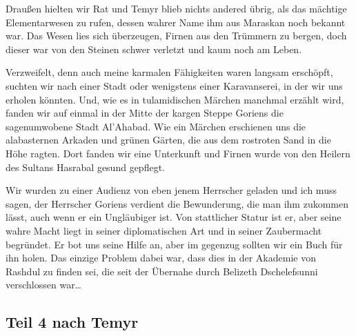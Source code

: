 Draußen hielten wir Rat und Temyr blieb nichts andered übrig, als das mächtige Elementarwesen zu rufen, dessen wahrer Name ihm aus Maraskan noch bekannt war. Das Wesen lies sich überzeugen, Firnen aus den Trümmern zu bergen, doch dieser war von den Steinen schwer verletzt und kaum noch am Leben.

Verzweifelt, denn auch meine karmalen Fähigkeiten waren langsam erschöpft, suchten wir nach einer Stadt oder wenigstens einer Karavanserei, in der wir uns erholen könnten. Und, wie es in tulamidischen Märchen manchmal erzählt wird, fanden wir auf einmal in der Mitte der kargen Steppe Goriens die sagenumwobene Stadt Al'Ahabad. Wie ein Märchen erschienen uns die alabasternen Arkaden und grünen Gärten, die aus dem rostroten Sand in die Höhe ragten. Dort fanden wir eine Unterkunft und Firnen wurde von den Heilern des Sultans Hasrabal gesund gepflegt.

Wir wurden zu einer Audienz von eben jenem Herrscher geladen und ich muss sagen, der Herrscher Goriens verdient die Bewunderung, die man ihm zukommen lässt, auch wenn er ein Ungläubiger ist. Von stattlicher Statur ist er, aber seine wahre Macht liegt in seiner diplomatischen Art und in seiner Zaubermacht begründet. Er bot uns seine Hilfe an, aber im gegenzug sollten wir ein Buch für ihn holen. Das einzige Problem dabei war, dass dies in der Akademie von Rashdul zu finden sei, die seit der Übernahe durch Belizeth Dschelefsunni verschlossen war\dots

\subsection{Teil 4 nach Temyr}

